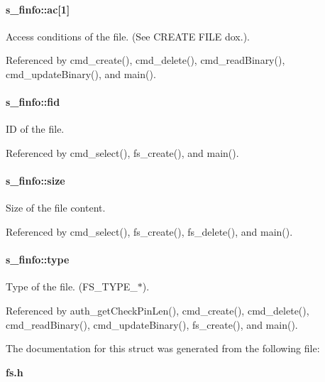 \paragraph[{ac}]{ {\bf s\_\-finfo::ac}[1]}\hfill\label{structs__finfo_a1f5a3947c58b7f6f5be099bf2e84b1aa}


Access conditions of the file. (See CREATE FILE dox.). 



Referenced by cmd\_\-create(), cmd\_\-delete(), cmd\_\-readBinary(), cmd\_\-updateBinary(), and main().

\paragraph[{fid}]{ {\bf s\_\-finfo::fid}}\hfill\label{structs__finfo_a864b248ae358e708aec64b7d7ddc35f3}


ID of the file. 



Referenced by cmd\_\-select(), fs\_\-create(), and main().

\paragraph[{size}]{ {\bf s\_\-finfo::size}}\hfill\label{structs__finfo_ae59b244a2c42920a988419568a0d4ab5}


Size of the file content. 



Referenced by cmd\_\-select(), fs\_\-create(), fs\_\-delete(), and main().

\paragraph[{type}]{ {\bf s\_\-finfo::type}}\hfill\label{structs__finfo_a41bbc495939ea65ac01a8e210bf9a47c}


Type of the file. (FS\_\-TYPE\_\-$\ast$). 



Referenced by auth\_\-getCheckPinLen(), cmd\_\-create(), cmd\_\-delete(), cmd\_\-readBinary(), cmd\_\-updateBinary(), fs\_\-create(), and main().



The documentation for this struct was generated from the following file:\begin{DoxyCompactItemize}
\item 
{\bf fs.h}\end{DoxyCompactItemize}
